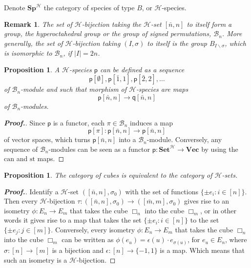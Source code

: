 \documentclass[11pt,reqno]{amsart}
\numberwithin{equation}{section}
\newtheorem{prop}[theorem]{Proposition}
\newtheorem{rem}[theorem]{Remark}
\def\SpB{{\mathbf{Sp}^{\H}}}
\def\SetB{{\mathbf{Set}^{\H}}}
\def\Vec{{\mathbf{Vec}}}
\def\H{{\mathcal{H}}}
\def\p{{\textsf{p}}}
\def\q{{\textsf{q}}}
\def\n{\bar{n},n}
\def\m{\bar{m},m}
\def\can{\mathrm{can}}
\def\st{\mathrm{st}}
\def\can{\mathrm{can}}
\def\Bn{\mathcal{B}_n}
\begin{document}
Denote $\SpB$ the category of species of type $B$, or $\H$-species. 


\begin{rem}
The set of $\H$-bijection taking the $\H$-set $[\n]$ to itself form a group, the hyperoctahedral group or the group of signed permutations, $\Bn$. More generally, the set of $\H$-bijection taking $(I,\sigma)$ to itself is the group $B_{I\backslash \sigma}$, which is isomorphic to $\Bn$, if $|I|=2n$.
\end{rem}


\begin{prop}
A $\H$-species $\p$ can be defined as a sequence
$$\p[\emptyset],\p[\bar{1},1],\p[\bar{2},2],\dots$$
of $\Bn$-module and such that morphism of $\H$-species are maps
$$\p[\n]\rightarrow \q[\n]$$
of $\Bn$-modules.
\end{prop}
\begin{proof}[\bf Proof.]
Since $\p$ is a functor, each $\pi\in \Bn$ induces a map
$$\p[\pi]\colon\p[\n]\rightarrow \p[\n]$$
of vector spaces, which turns $\p[\n]$ into a $\Bn$-module. Conversely, any sequence of $\Bn$-modules can be seen as a functor $\p\colon\SetB\rightarrow\Vec$ by using the $\can$ and $\st$ maps.
\end{proof}




\begin{prop}
The category of cubes is equivalent to the category of $\H$-sets.
\end{prop}
\begin{proof}[\bf Proof.]
Identify a $\H$-set $([\n],\sigma_0)$ with the set of functions $\{\pm e_i: i\in [n]\}$. Then every $\H$-bijection $\tau:([\n],\sigma_0)\rightarrow ([\m],\sigma_0)$ gives rise to an isometry $\phi\colon E_{n}\rightarrow E_{m}$ that takes the cube $\Box_{n}$ into the cube $\Box_{m}$, or in other words it gives rise to a map that takes the set $\{\pm e_i: i\in[n]\}$ to the set $\{\pm e_j :j\in [m]\}$. Conversely, every isometry $\phi\colon E_{n}\rightarrow E_{m}$ that takes the cube $\Box_{n}$ into the cube $\Box_{m}$ can be written as $\phi(e_u)=\epsilon (u)\cdot e_{\sigma(u)}$, for $e_u\in E_{n}$, where $\sigma\colon [n]\rightarrow [m]$ is a bijection and $\epsilon\colon [n]\rightarrow \{-1,1\}$ is a map. Which means that such an isometry is a $\H$-bijection.
\end{proof}
\end{document}
